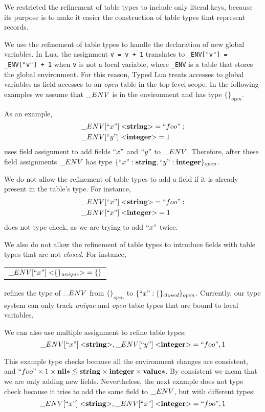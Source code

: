 \documentclass{sigplanconf}
\newcommand{\Value}{\mathbf{value}}
\newcommand{\Nil}{\mathbf{nil}}
\newcommand{\Integer}{\mathbf{integer}}
\newcommand{\String}{\mathbf{string}}
\begin{document}
We restricted the refinement of table types to include only literal
keys, because its purpose is to make it easier the construction of
table types that represent records.

We use the refinement of table types to handle the declaration of
new global variables.
In Lua, the assignment \texttt{v = v + 1} translates to
\texttt{\string_ENV["v"] = \string_ENV["v"] + 1} when \texttt{v}
is not a local variable, where \texttt{\string_ENV} is a table
that stores the global environment.
For this reason, Typed Lua treats accesses to global variables as field accesses
to an \emph{open} table in the top-level scope.
In the following examples we assume that $\string_ENV$ is in the
environment and has type $\{\}_{open}$.

As an example,
\begin{align*}
& \string_ENV[``x"] \; {<}\String{>} = ``foo" \;; \\
& \string_ENV[``y"] \; {<}\Integer{>} = 1
\end{align*}
uses field assignment to add fields $``x"$ and $``y"$ to $\string_ENV$.
Therefore, after these field assignments $\string_ENV$ has type
$\{``x":\String, ``y":\Integer\}_{open}$.

We do not allow the refinement of table types to add a field if it is
already present in the table's type.
For instance,
\begin{align*}
& \string_ENV[``x"] \; {<}\String{>} = ``foo" \;; \\
& \string_ENV[``x"] \; {<}\Integer{>} = 1
\end{align*}
does not type check, as we are trying to add $``x"$ twice.

We also do not allow the refinement of table types to introduce
fields with table types that are not \emph{closed}.
For instance,
\begin{center}
\begin{tabular}{l}
$\string_ENV[``x"] \; {<}\{\}_{unique}{>} = \{\}$
\end{tabular}
\end{center}
refines the type of $\string_ENV$ from $\{\}_{open}$ to $\{``x":\{\}_{closed}\}_{open}$.
Currently, our type system can only track \emph{unique} and
\emph{open} table types that are bound to local variables.

We can also use multiple assignment to refine table types:
\[
\string_ENV[``x"] \; {<}\String{>}, \string_ENV[``y"] \; {<}\Integer{>} = ``foo", 1
\]

This example type checks because all the environment changes are consistent, and
$``foo" \times 1 \times \Nil{*} \lesssim \String \times \Integer \times \Value{*}$.
By consistent we mean that we are only adding new fields.
Nevertheless, the next example does not type check because it tries to add
the same field to $\string_ENV$, but with different types:
\[
\string_ENV[``x"] \; {<}\String{>}, \string_ENV[``x"] \; {<}\Integer{>} = ``foo", 1
\]
\end{document}
